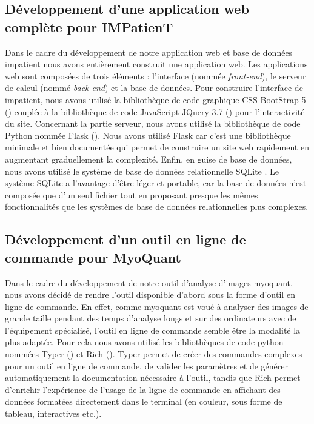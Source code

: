\subsection{Développement d'une application web complète pour IMPatienT}
Dans le cadre du développement de notre application web et base de données \gls{impatient} nous avons entièrement construit une application web. Les applications web sont composées de trois éléments : l'interface (nommée \textit{front-end}), le serveur de calcul (nommé \textit{back-end}) et la base de données. Pour construire l'interface de \gls{impatient}, nous avons utilisé la bibliothèque de code graphique CSS BootStrap 5 (\cite{mark_otto_bootstrap_2011}) couplée à la bibliothèque de code JavaScript JQuery 3.7 (\cite{resig_jquery_2006}) pour l'interactivité du site. Concernant la partie serveur, nous avons utilisé la bibliothèque de code Python nommée Flask (\cite{ronacher_flask_2010}).  Nous avons utilisé Flask car c'est une bibliothèque minimale et bien documentée qui permet de construire un site web rapidement en augmentant graduellement la complexité. Enfin, en guise de base de données, nous avons utilisé le système de base de données relationnelle SQLite \cite{hipp_sqlite_2020}. Le système SQLite a l'avantage d'être léger et portable, car la base de données n'est composée que d'un seul fichier tout en proposant presque les mêmes fonctionnalités que les systèmes de base de données relationnelles plus complexes.

\subsection{Développement d'un outil en ligne de commande pour MyoQuant}
Dans le cadre du développement de notre outil d'analyse d'images \gls{myoquant}, nous avons décidé de rendre l'outil disponible d'abord sous la forme d'outil en ligne de commande. En effet, comme \gls{myoquant} est voué à analyser des images de grande taille pendant des temps d'analyse longs et sur des ordinateurs avec de l'équipement spécialisé, l'outil en ligne de commande semble être la modalité la plus adaptée. Pour cela nous avons utilisé les bibliothèques de code python nommées Typer (\cite{ramirez_typer_2019}) et Rich (\cite{will_mcgugan_rich_2020}). Typer permet de créer des commandes complexes pour un outil en ligne de commande, de valider les paramètres et de générer automatiquement la documentation nécessaire à l'outil, tandis que Rich permet d'enrichir l'expérience de l'usage de la ligne de commande en affichant des données formatées directement dans le terminal (en couleur, sous forme de tableau, interactives etc.).

